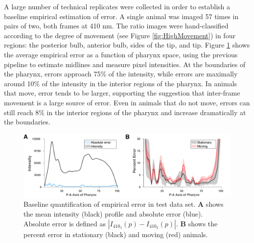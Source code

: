 A large number of technical replicates were collected in order to establish a baseline empirical estimation of error. A single animal was imaged 57 times in pairs of two, both frames at 410 nm. The ratio images were hand-classified according to the degree of movement (see Figure \ref{fig:HighMovement}) in four regions: the posterior bulb, anterior bulb, sides of the tip, and tip. 
Figure \ref{fig:ErrorInOldPipeline} shows the average empirical error as a function of pharynx space, using the previous pipeline to estimate midlines and measure pixel intensities. At the boundaries of the pharynx, errors approach 75\% of the intensity, while errors are maximally around 10\% of the intensity in the interior regions of the pharynx. In animals that move, error tends to be larger, supporting the suggestion that inter-frame movement is a large source of error. Even in animals that do not move, errors can still reach 8\% in the interior regions of the  pharynx and increase dramatically at the boundaries.


\begin{figure}
    \centering
    \includegraphics[scale=0.30]{Figures/rendered_files/error_and_intensity}
    \decoRule
    \caption[Errors in old pipeline]{Baseline quantification of empirical error in test data set. \textbf{A} shows the mean intensity (black) profile and absolute error (blue). Absolute error is defined as $|I_{410_1}(p)-I_{410_2}(p)|$. \textbf{B} shows the percent error in stationary (black) and moving (red) animals.}
    \label{fig:ErrorInOldPipeline}
\end{figure}


